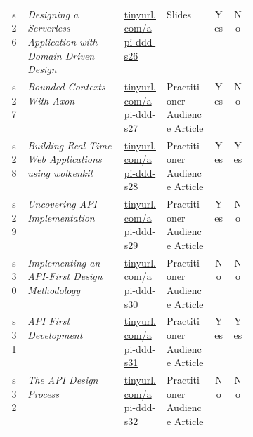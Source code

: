 \begin{tabular}{|c|p{0.4\linewidth}|l|l|c|c|}
s26 &  {\em Designing a Serverless Application with Domain Driven Design} & \href{https://tinyurl.com/api-ddd-s26}{tinyurl.com/api-ddd-s26} & Slides & Yes & No\\
s27 &  {\em Bounded Contexts With Axon} & \href{https://tinyurl.com/api-ddd-s27}{tinyurl.com/api-ddd-s27} & Practitioner Audience Article & Yes & No\\
s28 &  {\em Building Real-Time Web Applications using wolkenkit} & \href{https://tinyurl.com/api-ddd-s28}{tinyurl.com/api-ddd-s28} & Practitioner Audience Article & Yes & Yes\\
s29 &  {\em Uncovering API Implementation} & \href{https://tinyurl.com/api-ddd-s29}{tinyurl.com/api-ddd-s29} & Practitioner Audience Article & Yes & No\\
s30 &  {\em Implementing an API-First Design Methodology} & \href{https://tinyurl.com/api-ddd-s30}{tinyurl.com/api-ddd-s30} & Practitioner Audience Article & No & No\\
s31 &  {\em API First Development} & \href{https://tinyurl.com/api-ddd-s31}{tinyurl.com/api-ddd-s31} & Practitioner Audience Article & Yes & Yes\\
s32 &  {\em The API Design Process} & \href{https://tinyurl.com/api-ddd-s32}{tinyurl.com/api-ddd-s32} & Practitioner Audience Article & No & No\\
\bottomrule
\end{tabular}
